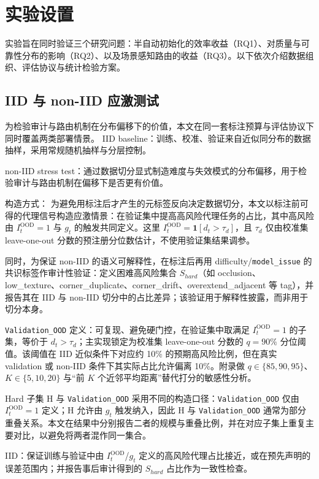 ﻿\section{实验设置}

实验旨在同时验证三个研究问题：半自动初始化的效率收益（RQ1）、对质量与可靠性分布的影响（RQ2）、以及场景感知路由的收益（RQ3）。以下依次介绍数据组织、评估协议与统计检验方案。
\subsection{IID 与 non-IID 应激测试}\label{sec:exp-iid-stress}

为检验审计与路由机制在分布偏移下的价值，本文在同一套标注预算与评估协议下同时覆盖两类部署情景。
IID baseline：训练、校准、验证来自近似同分布的数据抽样，采用常规随机抽样与分层控制。

non-IID stress test：通过数据切分显式制造难度与失效模式的分布偏移，用于检验审计与路由机制在偏移下是否更有价值。

构造方式：
为避免用标注后才产生的元标签反向决定数据切分，本文以标注前可得的代理信号构造应激情景：在验证集中提高高风险代理任务的占比，其中高风险由 $I_t^{\mathrm{OOD}}=1$ 与 $g_t$ 的触发共同定义。这里 $I_t^{\mathrm{OOD}}=\mathbf{1}[d_t>\tau_d]$，且 $\tau_d$ 仅由校准集 leave-one-out 分数的预注册分位数估计，不使用验证集结果调参。

同时，为保证 non-IID 的语义可解释性，在标注后再用 difficulty/\texttt{model\_issue} 的共识标签作审计性验证：定义困难高风险集合 $S_{hard}$（如 occlusion、low\_texture、corner\_duplicate、corner\_drift、overextend\_adjacent 等 tag），并报告其在 IID 与 non-IID 切分中的占比差异；该验证用于解释性披露，而非用于切分本身。

\texttt{Validation\_OOD} 定义：可复现、避免硬门控，在验证集中取满足 $I_t^{\mathrm{OOD}}=1$ 的子集，等价于 $d_t>\tau_d$；主实现锁定为校准集 leave-one-out 分数的 $q=90\%$ 分位阈值。该阈值在 IID 近似条件下对应约 10\% 的预期高风险比例，但在真实 validation 或 non-IID 条件下其实际占比允许偏离 10\%。附录做 $q\in\{85,90,95\}$、$K\in\{5,10,20\}$ 与“前 $K$ 个近邻平均距离”替代打分的敏感性分析。

Hard 子集 H 与 \texttt{Validation\_OOD} 采用不同的构造口径：\texttt{Validation\_OOD} 仅由 $I_t^{\mathrm{OOD}}=1$ 定义；H 允许由 $g_t$ 触发纳入，因此 H 与 \texttt{Validation\_OOD} 通常为部分重叠关系。本文在结果中分别报告二者的规模与重叠比例，并在对应子集上重复主要对比，以避免将两者混作同一集合。

IID：保证训练与验证中由 $I_t^{\mathrm{OOD}}$/$g_t$ 定义的高风险代理占比接近，或在预先声明的误差范围内；并报告事后审计得到的 $S_{hard}$ 占比作为一致性检查。

